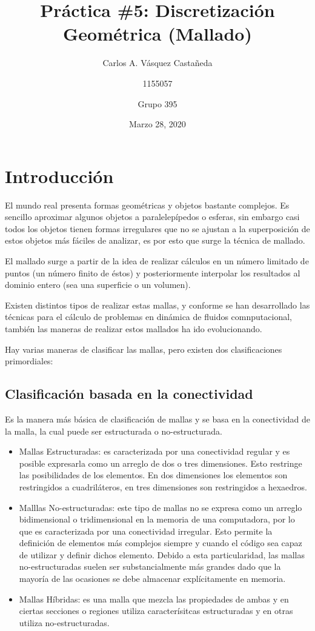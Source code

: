 \documentclass[12pt, letterpaper]{article}
\title{Práctica \#5: Discretización Geométrica (Mallado)}
\author{Carlos A. Vásquez Castañeda \and 1155057 \and Grupo 395}
\date{Marzo 28, 2020}
\begin{document}
\maketitle

\section*{Introducción}
El mundo real presenta formas geométricas y objetos bastante complejos. Es sencillo aproximar algunos objetos a paralelepípedos o esferas, sin embargo casi todos los objetos tienen formas irregulares que no se ajustan a la superposición de estos objetos más fáciles de analizar, es por esto que surge la técnica de mallado.

El mallado surge a partir de la idea de realizar cálculos en un número limitado de puntos (un número finito de éstos) y posteriormente interpolar los resultados al dominio entero (sea una superficie o un volumen).

Existen distintos tipos de realizar estas mallas, y conforme se han desarrollado las técnicas para el cálculo de problemas en dinámica de fluidos comnputacional, también las maneras de realizar estos mallados ha ido evolucionando.

Hay varias maneras de clasificar las mallas, pero existen dos clasificaciones primordiales:

\subsection*{Clasificación basada en la conectividad}
Es la manera más básica de clasificación de mallas y se basa en la conectividad de la malla, la cual puede ser estructurada o no-estructurada.

\begin{itemize}
	\item Mallas Estructuradas: es caracterizada por una conectividad regular y es posible expresarla como un arreglo de dos o tres dimensiones. Esto restringe las posibilidades de los elementos. En dos dimensiones los elementos son restringidos a cuadriláteros, en tres dimensiones son restringidos a hexaedros.

	\item Malllas No-estructuradas: este tipo de mallas no se expresa como un arreglo bidimensional o tridimensional en la memoria de una computadora, por lo que es caracterizada por una conectividad irregular. Esto permite la definición de elementos más complejos siempre y cuando el código sea capaz de utilizar y definir dichos elemento. Debido a esta particularidad, las mallas no-estructuradas suelen ser substancialmente más grandes dado que la mayoría de las ocasiones se debe almacenar explícitamente en memoria.

	\item Mallas Híbridas: es una malla que mezcla las propiedades de ambas y en ciertas secciones o regiones utiliza caracterísitcas estructuradas y en otras utiliza no-estructuradas.
\end{itemize}
\end{document}
